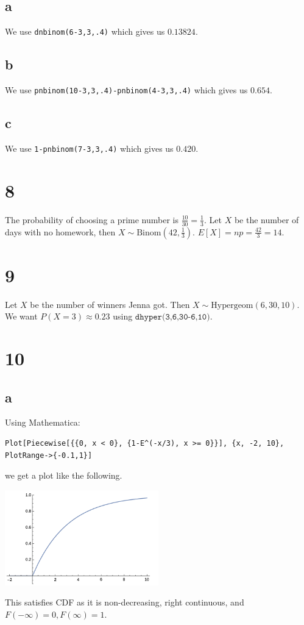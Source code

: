 \documentclass[10pt]{article}
\begin{document}
\subsection*{a}
We use \texttt{dnbinom(6-3,3,.4)} which gives us $0.13824.$
\subsection*{b}
We use \texttt{pnbinom(10-3,3,.4)-pnbinom(4-3,3,.4)} which gives us $0.654.$
\subsection*{c}
We use \texttt{1-pnbinom(7-3,3,.4)} which gives us $0.420.$

\section*{8}
The probability of choosing a prime number is $\frac{10}{30}=\frac{1}{3}.$ Let $X$ be the number of days with no homework, then $X\sim\text{Binom}(42,\frac{1}{3}).$ $E[X]=np=\frac{42}{3}=14.$

\section*{9}
Let $X$ be the number of winners Jenna got. Then $X\sim\text{Hypergeom}(6,30,10).$ We want $P(X=3)\approx0.23$ using $\texttt{dhyper(3,6,30-6,10)}.$

\section*{10}
\subsection*{a}
Using Mathematica:
    \begin{verbatim}
Plot[Piecewise[{{0, x < 0}, {1-E^(-x/3), x >= 0}}], {x, -2, 10}, PlotRange->{-0.1,1}]\end{verbatim}
we get a plot like the following.
\begin{center}
    \includegraphics[width=0.5\textwidth]{hw6_10.png}
\end{center}
This satisfies CDF as it is non-decreasing, right continuous, and $F(-\infty)=0, F(\infty)=1.$
\end{document}
